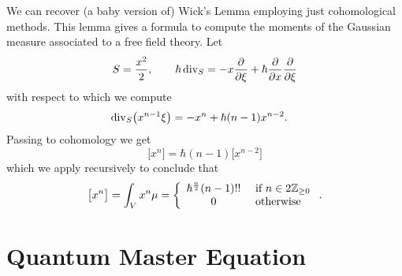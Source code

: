 \begin{proposition}
  We can recover (a baby version of) Wick's Lemma employing just cohomological methods. This lemma gives a formula to compute the moments of the Gaussian measure associated to a free field theory. Let
  \begin{equation*}
    S = \frac{x^2}{2}, \qquad
    \hbar \operatorname{div}_S
    = - x \frac{\partial}{\partial \xi}
    + \hbar \frac{\partial}{\partial x} \frac{\partial}{\partial \xi}
  \end{equation*}
  with respect to which we compute
  \begin{align*}
    \operatorname{div}_S \bigl( x^{n-1} \xi \bigr)
    &= - x^n + \hbar (n-1) x^{n-2}.
  \end{align*}
  Passing to cohomology we get
  \begin{equation*}
    \bigl[x^n\bigr] = \hbar (n-1) \bigl[x^{n-2}\bigr]
  \end{equation*}
  which we apply recursively to conclude that
  \begin{equation*}
    \bigl[x^n\bigr]
    = \int_V x^n \mu
    = \left\{
      \begin{array}{cl}
        \hbar^{\frac{n}{2}} (n-1)!! & \text{ if } n \in 2 \mathbb{Z}_{\geq 0} \\
       0 & \text{ otherwise}
      \end{array}
    \right. .
  \end{equation*}
\end{proposition}

\section{Quantum Master Equation}


